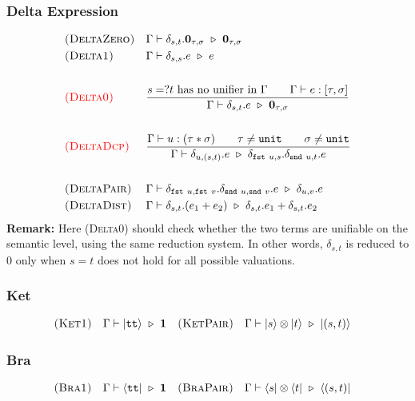 \subsubsection*{Delta Expression}
\begin{align*}
  & \textsc{(DeltaZero)} && 
  \Gamma \vdash \delta_{s, t}.\mathbf{0}_{\tau, \sigma} \ \triangleright\  \mathbf{0}_{\tau, \sigma}
  \\
  & \textsc{(Delta1)} && 
  \Gamma \vdash \delta_{s, s}.e \ \triangleright\  e 
  \\
  \\
  & \textcolor{red}{\textsc{(Delta0)}} && 
  \frac{s =? t\ \textrm{has no unifier in}\ \Gamma \qquad \Gamma \vdash e : [\tau, \sigma]}{\Gamma \vdash \delta_{s, t}.e \ \triangleright\  \textbf{0}_{\tau, \sigma}} \\
  \\
  & \textcolor{red}{\textsc{(DeltaDcp)}} && 
  \frac{\Gamma \vdash u : ( \tau * \sigma ) \qquad \tau \neq \texttt{unit} \qquad \sigma \neq \texttt{unit}}{\Gamma \vdash \delta_{u, (s, t)}.e \ \triangleright\  \delta_{\texttt{fst}\ u, s}.\delta_{\texttt{snd}\ u, t}.e} 
  \\
  \\
  & \textsc{(DeltaPair)} &&
  \Gamma \vdash \delta_{\texttt{fst}\ u, \texttt{fst}\ v}.\delta_{\texttt{snd}\ u, \texttt{snd}\ v}.e \ \triangleright\  \delta_{u, v}.e 
  \\
  & \textsc{(DeltaDist)} &&
  \Gamma \vdash \delta_{s, t}.(e_1 + e_2) \ \triangleright\  \delta_{s, t}.e_1 + \delta_{s, t}.e_2
\end{align*}
\textbf{Remark:} Here \textsc{(Delta0)} should check whether the two terms are unifiable on the semantic level, using the same reduction system. In other words, $\delta_{s, t}$ is reduced to 0 only when $s = t$ does not hold for all possible valuations.

\subsubsection*{Ket}
\begin{align*}
  & \textsc{(Ket1)} && \Gamma \vdash |\texttt{tt}\rangle \ \triangleright\  \mathbf{1}
  && \textsc{(KetPair)} && \Gamma \vdash |s\rangle \otimes |t\rangle\ \triangleright\ |(s, t)\rangle 
\end{align*}

\subsubsection*{Bra}
\begin{align*}
  & \textsc{(Bra1)} && \Gamma \vdash \langle \texttt{tt}| \ \triangleright\  \mathbf{1}
  && \textsc{(BraPair)} && \Gamma \vdash \langle s| \otimes \langle t|\ \triangleright\ \langle (s, t)| 
\end{align*}


